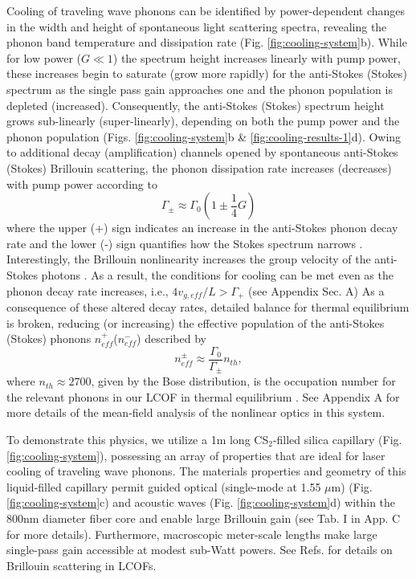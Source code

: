 Cooling of traveling wave phonons can be identified by power-dependent changes in the width and height of spontaneous light scattering spectra, revealing the phonon band temperature and dissipation rate (Fig. \ref{fig:cooling-system}b). While for low power ($G \ll 1$) the spectrum height increases linearly with pump power, these increases begin to saturate (grow more rapidly) for the anti-Stokes (Stokes) spectrum as the single pass gain approaches one and the phonon population is depleted (increased). Consequently, the anti-Stokes (Stokes) spectrum height grows sub-linearly (super-linearly), depending on both the pump power and the phonon population (Figs. \ref{fig:cooling-system}b \& \ref{fig:cooling-results-1}d). Owing to additional decay (amplification) channels opened by spontaneous anti-Stokes (Stokes) Brillouin scattering, the phonon dissipation rate increases (decreases) with pump power according to
\begin{equation}
\label{eq:gamma}
   \Gamma_{\pm} \approx \Gamma_0\left(1\pm \frac{1}{4}G\right)
\end{equation}
where the upper (+) sign indicates an increase in the anti-Stokes phonon decay rate and the lower (-) sign quantifies how the Stokes spectrum narrows \citep{otterstrom2018optomechanical}.
%
Interestingly, the Brillouin nonlinearity increases the group velocity of the anti-Stokes photons  \citep{gonzalez2005optically}. As a result, the conditions for cooling can be met even as the phonon decay rate increases, i.e., $4 v_{g,eff}/L > \Gamma_+$ (see Appendix Sec. A)
%
As a consequence of these altered decay rates, detailed balance for thermal equilibrium is broken, reducing (or increasing) the effective population of the anti-Stokes (Stokes) phonons $n^+_{eff}$($n^-_{eff}$) described by
\begin{equation}
\label{eq:neff}
    n^{\pm}_{eff} \approx \frac{\Gamma_0}{\Gamma_{\pm}} n_{th},
\end{equation}
where $n_{th} \approx 2700$, given by the Bose distribution, is the occupation number for the relevant phonons in our \acf{LCOF} in thermal equilibrium \citep{otterstrom2018optomechanical}. See Appendix A for more details of the mean-field analysis of the nonlinear optics in this system.

To demonstrate this physics, we utilize a 1m long CS$_2$-filled silica capillary (Fig. \ref{fig:cooling-system}), possessing an array of properties that are ideal for laser cooling of traveling wave phonons. The materials properties and geometry of this liquid-filled capillary permit guided optical (single-mode at 1.55 $\mu$m) (Fig. \ref{fig:cooling-system}c) and acoustic waves (Fig. \ref{fig:cooling-system}d) within the $800$nm diameter fiber core and enable large Brillouin gain (see Tab. I in App. C for more details). Furthermore, macroscopic meter-scale lengths make large single-pass gain accessible at modest sub-Watt powers. See Refs. \citep{kieu2013brillouin,kieu2014nonlinear,behunin2019spontaneous} for details on Brillouin scattering in \ac{LCOF}s.

